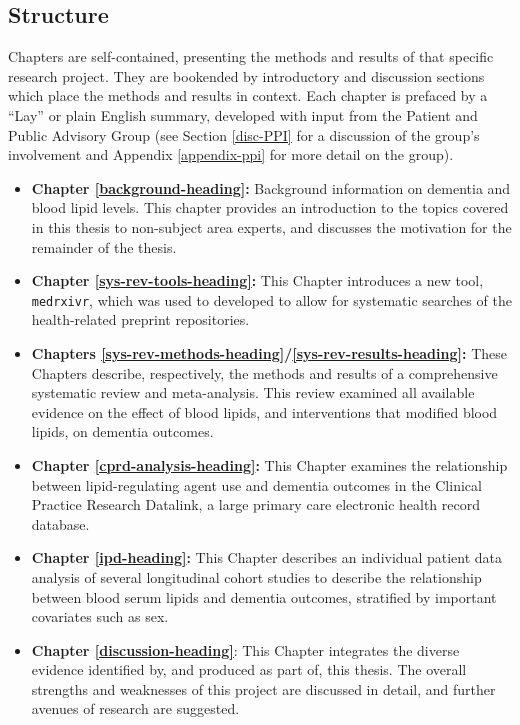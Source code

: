 \documentclass[a4paper, twoside]{templates/ociamthesis}
\providecommand{\tightlist}{%
  \setlength{\itemsep}{0pt}\setlength{\parskip}{0pt}}
\begin{document}
\hypertarget{thesis-structure}{%
\subsection{Structure}\label{thesis-structure}}

Chapters are self-contained, presenting the methods and results of that specific research project. They are bookended by introductory and discussion sections which place the methods and results in context. Each chapter is prefaced by a ``Lay'' or plain English summary, developed with input from the Patient and Public Advisory Group (see Section \ref{disc-PPI} for a discussion of the group's involvement and Appendix \ref{appendix-ppi} for more detail on the group).

\begin{itemize}
\tightlist
\item
  \textbf{Chapter \ref{background-heading}:} Background information on dementia and blood lipid levels. This chapter provides an introduction to the topics covered in this thesis to non-subject area experts, and discusses the motivation for the remainder of the thesis.
\item
  \textbf{Chapter \ref{sys-rev-tools-heading}:} This Chapter introduces a new tool, \texttt{medrxivr}, which was used to developed to allow for systematic searches of the health-related preprint repositories.
\item
  \textbf{Chapters \ref{sys-rev-methods-heading}/\ref{sys-rev-results-heading}:} These Chapters describe, respectively, the methods and results of a comprehensive systematic review and meta-analysis. This review examined all available evidence on the effect of blood lipids, and interventions that modified blood lipids, on dementia outcomes.
\item
  \textbf{Chapter \ref{cprd-analysis-heading}:} This Chapter examines the relationship between lipid-regulating agent use and dementia outcomes in the Clinical Practice Research Datalink, a large primary care electronic health record database.
\item
  \textbf{Chapter \ref{ipd-heading}:} This Chapter describes an individual patient data analysis of several longitudinal cohort studies to describe the relationship between blood serum lipids and dementia outcomes, stratified by important covariates such as sex.
\item
  \textbf{Chapter \ref{discussion-heading}}: This Chapter integrates the diverse evidence identified by, and produced as part of, this thesis. The overall strengths and weaknesses of this project are discussed in detail, and further avenues of research are suggested.
\end{itemize}
\end{document}
